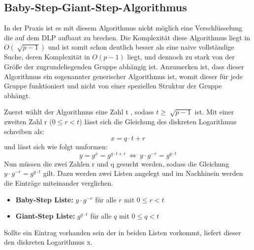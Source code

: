 	\subsection{Baby-Step-Giant-Step-Algorithmus}\label{Kapitel Baby Step Giant Step Algorithmus}
		In der Praxis ist es mit diesem Algorithmus nicht möglich eine Verschlüsselung die auf dem DLP aufbaut zu brechen. Die Komplexität diese Algorithmus liegt in $O(\sqrt[]{p-1})$ und ist somit schon deutlich besser als eine naive vollständige Suche, deren Komplexität in $O(p-1)$ liegt, und dennoch zu stark von der Größe der zugrundeliegenden Gruppe abhängig ist. Anzumerken ist, dass dieser Algorithmus ein sogenannter generischer Algorithmus ist, womit dieser für jede Gruppe funktioniert und nicht von einer speziellen Struktur der Gruppe abhängt.~\cite{Kryptografie:in:Theorie:und:Praxis}
		
		Zuerst wählt der Algorithmus eine Zahl t \myin {}, sodass $t \geq \sqrt[]{p-1}$ ist. Mit einer zweiten Zahl r ($0 \leq r<t$) lässt sich die Gleichung des diskreten Logarithmus schreiben als:
		\begin{equation}
			x = q \cdot t + r
			\label{Gleichung Diskreter Logarithmus}
		\end{equation}
		und lässt sich wie folgt umformen:
		\begin{equation}
			y = g^x = g^{q \cdot t + r}~\Leftrightarrow~y \cdot g^{-r} = g^{q \cdot t}
			\label{Gleichung Baby steps Giant steps}
		\end{equation}
		Nun müssen die zwei Zahlen r und q gesucht werden, sodass die Gleichung $y \cdot g^{-r} = g^{q \cdot t}$ gilt. Dazu werden zwei Listen angelegt und im Nachhinein werden die Einträge miteinander verglichen. 
		\begin{itemize}
			\item[] \textbf{Baby-Step Liste:} $y \cdot g^{-r}$ für alle $r$ mit $0 \leq r < t$
			\item[] \textbf{Giant-Step Liste:} $g^{q \cdot t}$ für alle $q$ mit $0 \leq q < t$
		\end{itemize}
		Sollte ein Eintrag vorhanden sein der in beiden Listen vorkommt, liefert dieser den diskreten Logarithmus x.~\cite{Kryptografie:in:Theorie:und:Praxis}
		
